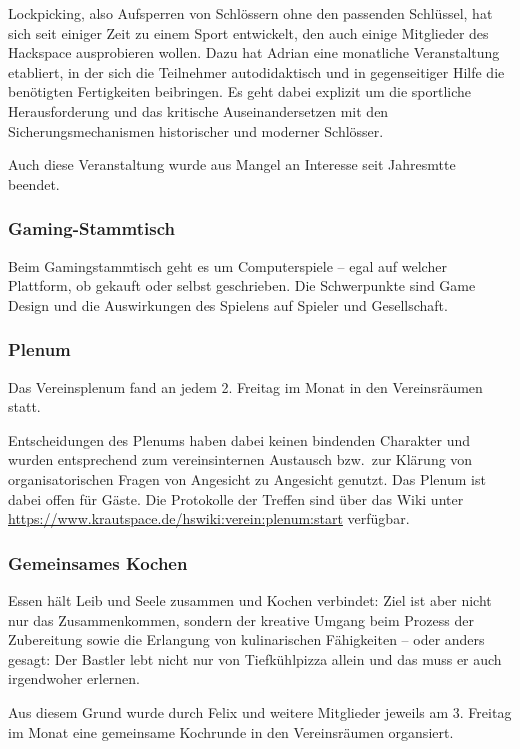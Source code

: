 \documentclass[10pt,DIV16]{scrartcl}
\begin{document}
Lockpicking, also Aufsperren von Schlössern ohne den passenden
Schlüssel, hat sich seit einiger Zeit zu einem Sport entwickelt, den
auch einige Mitglieder des Hackspace ausprobieren wollen. Dazu hat
Adrian eine monatliche Veranstaltung etabliert, in der sich die Teilnehmer
autodidaktisch und in gegenseitiger Hilfe die benötigten Fertigkeiten
beibringen. Es geht dabei explizit um die sportliche Herausforderung
und das kritische Auseinandersetzen mit den Sicherungsmechanismen
historischer und moderner Schlösser.

Auch diese Veranstaltung wurde aus Mangel an Interesse seit Jahresmtte beendet. 

\subsubsection{Gaming-Stammtisch}

Beim Gamingstammtisch geht es um Computerspiele – egal auf welcher Plattform, ob gekauft oder selbst geschrieben.
Die Schwerpunkte sind Game Design und die Auswirkungen des Spielens auf Spieler und Gesellschaft. 

\subsubsection{Plenum}

Das Vereinsplenum fand an jedem 2. Freitag im Monat in den
Vereinsräumen statt.

Entscheidungen des Plenums haben dabei keinen bindenden Charakter und
wurden entsprechend zum vereinsinternen Austausch bzw.\ zur Klärung von
organisatorischen Fragen von Angesicht zu Angesicht genutzt. Das Plenum ist dabei offen für Gäste.
Die Protokolle der Treffen sind über das Wiki unter
\url{https://www.krautspace.de/hswiki:verein:plenum:start} verfügbar.

\subsubsection{Gemeinsames Kochen}

Essen hält Leib und Seele zusammen und Kochen verbindet:
Ziel ist aber nicht nur das Zusammenkommen, sondern der kreative Umgang
beim Prozess der Zubereitung sowie die Erlangung von kulinarischen
Fähigkeiten -- oder anders gesagt: Der Bastler lebt nicht nur von
Tiefkühlpizza allein und das muss er auch irgendwoher erlernen.

Aus diesem Grund wurde durch Felix und weitere Mitglieder jeweils am 3. Freitag
im Monat eine gemeinsame Kochrunde in den Vereinsräumen organsiert.
\end{document}
